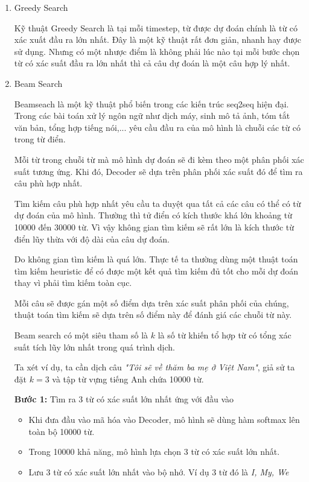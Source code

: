 \documentclass[14pt, a4paper]{article}
\numberwithin{equation}{section}
\numberwithin{algorithm}{section}
\numberwithin{figure}{section}
\numberwithin{table}{section}
\numberwithin{dl}{section}
\numberwithin{md}{section}
\numberwithin{bd}{section}
\numberwithin{dn}{section}
\numberwithin{hq}{section}
\begin{document}
    \begin{enumerate} [label=(\alph*)]
        \item Greedy Search

        Kỹ thuật Greedy Search là tại mỗi timestep, từ được dự đoán chính là từ có xác xuất đầu ra lớn nhất.
        Đây là một kỹ thuật rất đơn giản, nhanh hay được sử dụng. 
        Nhưng có một nhược điểm là không phải lúc nào tại mỗi bước chọn từ có xác suất đầu ra lớn nhất thì cả câu dự đoán là một câu hợp lý nhất.

        \item Beam Search
        
        Beamseach là một kỹ thuật phổ biến trong các kiến trúc seq2seq hiện đại. 
        Trong các bài toán xử lý ngôn ngữ như dịch máy, sinh mô tả ảnh, tóm tắt văn bản, tổng hợp tiếng nói,... yêu cầu đầu ra của mô hình là chuỗi các từ có trong từ điển.

        Mỗi từ trong chuỗi từ mà mô hình dự đoán sẽ đi kèm theo một phân phối xác suất tương ứng.
        Khi đó, Decoder sẽ dựa trên phân phối xác suất đó để tìm ra câu phù hợp nhất.

        Tìm kiếm câu phù hợp nhất yêu cầu ta duyệt qua tất cả các câu có thể có từ dự đoán của mô hình.
        Thường thì tử điển có kích thước khá lớn khoảng từ 10000 đến 30000 từ. Vì vậy không gian tìm kiếm sẽ rất lớn là kích thước từ điển lũy thừa với độ dài của câu dự đoán.

        Do không gian tìm kiếm là quá lớn. Thực tế ta thường dùng một thuật toán tìm kiếm heuristic để có được một kết quả tìm kiếm đủ tốt cho mỗi dự đoán thay vì phải tìm kiếm toàn cục.

        Mỗi câu sẽ được gán một số điểm dựa trên xác suất phân phối của chúng, thuật toán tìm kiếm sẽ dựa trên số điểm này để đánh giá các chuỗi từ này.

        Beam search có một siêu tham số là $k$ là số từ khiến tổ hợp từ có tổng xác suất tích lũy lớn nhất trong quá trình dịch.

        Ta xét ví dụ, ta cần dịch câu \textit{"Tôi sẽ về thăm ba mẹ ở Việt Nam"}, giả sử ta đặt $k=3$ và tập từ vựng tiếng Anh chứa 10000 từ.

        \textbf{Bước 1:} Tìm ra 3 từ có xác suất lớn nhất ứng với đầu vào

        \begin{itemize}
            \item Khi đưa đầu vào mã hóa vào Decoder, mô hình sẽ dùng hàm softmax lên toàn bộ 10000 từ.
            \item Trong 10000 khả năng, mô hình lựa chọn 3 từ có xác suất lớn nhất.
            \item Lưu 3 từ có xác suất lớn nhất vào bộ nhớ. Ví dụ 3 từ đó là \textit{I, My, We}
        \end{itemize}


\end{enumerate}
\end{document}

